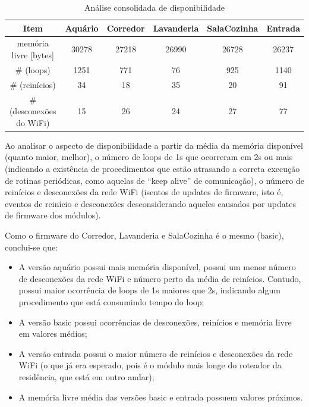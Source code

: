 \begin{table}[H]
    \caption{Análise consolidada de disponibilidade}
    \setlength\tabcolsep{1.5pt}
    \centering
    \footnotesize
    \begin{tabular}{cccccc}
        \textbf{Item} & \textbf{Aquário} & \textbf{Corredor} & \textbf{Lavanderia} & \textbf{SalaCozinha} & \textbf{Entrada} \\
        \midrule
        memória livre [bytes] &
        30278 &
        27218 &
        26990 &
        26728 &
        26237 \\
        \# (loops) &
        1251 &
        771 &
        76 &
        925 &
        1140 \\
        \# (reinícios) &
        34 &
        18 &
        35 &
        20 &
        91 \\
        \# (desconexões do WiFi) &
        15 &
        26 &
        24 &
        27 &
        77 \\
    \end{tabular}
\end{table}

Ao analisar o aspecto de disponibilidade a partir da média da memória disponível (quanto maior, melhor), o número de loops de 1s que ocorreram em 2s ou mais (indicando a existência de procedimentos que estão atrasando a correta execução de rotinas periódicas, como aquelas de “keep alive” de comunicação), o número de reinícios e desconexões da rede WiFi (isentos de updates de firmware, isto é, eventos de reinício e desconexões desconsiderando aqueles causados por updates de firmware dos módulos).

Como o firmware do Corredor, Lavanderia e SalaCozinha é o mesmo (basic), conclui-se que:

\begin{itemize}
	\item A versão aquário possui mais memória disponível, possui um menor número de desconexões da rede WiFi e número perto da média de reinícios. Contudo, possui maior ocorrência de loops de 1s maiores que 2s, indicando algum procedimento que está consumindo tempo do loop;
	\item A versão basic possui ocorrências de desconexões, reinícios e memória livre em valores médios;
	\item A versão entrada possui o maior número de reinícios e desconexões da rede WiFi (o que já era esperado, pois é o módulo mais longe do roteador da residência, que está em outro andar);
	\item A memória livre média das versões basic e entrada possuem valores próximos.
\end{itemize}

